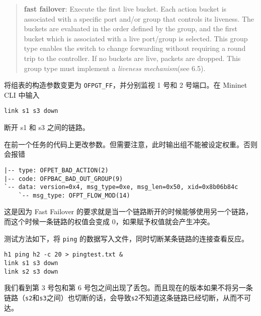     \begin{quotation}
        \textbf{fast failover}: Execute the first live bucket. Each action bucket is associated with a specific
port and/or group that controls its liveness. The buckets are evaluated in the order defined by the
group, and the first bucket which is associated with a live port/group is selected. This group type
enables the switch to change forwarding without requiring a round trip to the controller. If no buckets
are live, packets are dropped. This group type must implement a \emph{liveness mechanism}(see 6.5).\cite{openflow13}
    \end{quotation}

    将组表的构造参数变更为 \verb"OFPGT_FF"，并分别监视 1 号和 2 号端口。在 Mininet CLI 中输入
    \begin{lstlisting}[style=commandshell]
    link s1 s3 down\end{lstlisting}
    断开 s1 和 s3 之间的链路\cite{mininetdown}。

    在前一个任务的代码上更改参数。但需要注意，此时输出组不能被设定权重。否则会报错
    \begin{verbatim}
|-- type: OFPET_BAD_ACTION(2)
|-- code: OFPBAC_BAD_OUT_GROUP(9)
`-- data: version=0x4, msg_type=0xe, msg_len=0x50, xid=0x8b06b84c
    `-- msg_type: OFPT_FLOW_MOD(14)       
    \end{verbatim}
    这是因为 Fast Failover 的要求就是当一个链路断开的时候能够使用另一个链路，而这个时候一条链路的权值会变成 0，如果赋予权值就会产生冲突。



    测试方法如下，将 \verb"ping" 的数据写入文件，同时切断某条链路的连接查看反应。
    \begin{lstlisting}[style=commandshell]
h1 ping h2 -c 20 > pingtest.txt &
link s1 s3 down
link s2 s3 down\end{lstlisting}


    我们看到第 3 号包和第 6 号包之间出现了丢包。而且现在的版本如果不将另一条链路（\verb"s2"和\verb"s3"之间）也切断的话，会导致\verb"s2"不知道这条链路已经切断，从而不可达。
    

